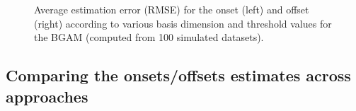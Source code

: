 \documentclass[
  doc,
  floatsintext,
  longtable,
  a4paper,
  nolmodern,
  notxfonts,
  notimes,
  donotrepeattitle,
  colorlinks=true,linkcolor=blue,citecolor=blue,urlcolor=blue]{apa7}
\begin{document}
\begin{figure}[!htb]

\caption{\label{fig-onset-error}Average estimation error (RMSE) for the
onset (left) and offset (right) according to various basis dimension and
threshold values for the BGAM (computed from 100 simulated datasets).}


\end{figure}%

\newpage

\subsection{Comparing the onsets/offsets estimates across
approaches}\label{comparing-the-onsetsoffsets-estimates-across-approaches}
\end{document}
